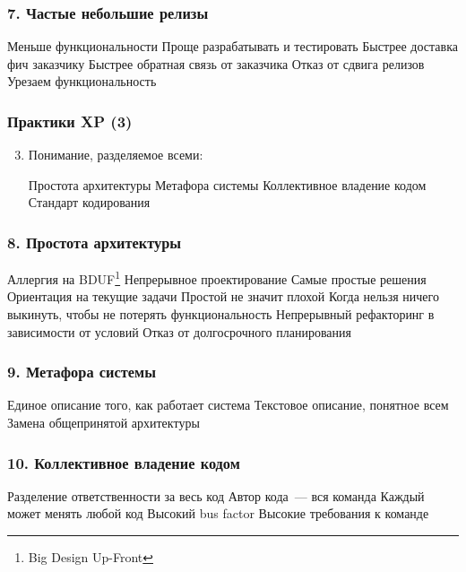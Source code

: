 \documentclass{../../slides-style}
\begin{document}
    \begin{frame}
        \frametitle{7. Частые небольшие релизы}
        \begin{outline}
            \1 Меньше функциональности
                \2 Проще разрабатывать и тестировать
            \1 Быстрее доставка фич заказчику
            \1 Быстрее обратная связь от заказчика
            \1 Отказ от сдвига релизов
                \2 Урезаем функциональность
        \end{outline}
    \end{frame}

    \begin{frame}
        \frametitle{Практики XP (3)}
        \begin{enumerate}
            \setcounter{enumi}{2}
            \item Понимание, разделяемое всеми:
            \begin{outline}
                \1 Простота архитектуры
                \1 Метафора системы
                \1 Коллективное владение кодом
                \1 Стандарт кодирования
            \end{outline}
        \end{enumerate}
    \end{frame}

    \begin{frame}
        \frametitle{8. Простота архитектуры}
        \begin{outline}
            \1 Аллергия на BDUF\footnote{Big Design Up-Front}
            \1 Непрерывное проектирование
            \1 Самые простые решения
                \2 Ориентация на текущие задачи
                    \3 Простой не значит плохой
                    \3 Когда нельзя ничего выкинуть, чтобы не потерять функциональность
                \2 Непрерывный рефакторинг в зависимости от условий
            \1 Отказ от долгосрочного планирования
        \end{outline}
    \end{frame}

    \begin{frame}
        \frametitle{9. Метафора системы}
        \begin{outline}
            \1 Единое описание того, как работает система
                \2 Текстовое описание, понятное всем
            \1 Замена общепринятой архитектуры
        \end{outline}
    \end{frame}

    \begin{frame}
        \frametitle{10. Коллективное владение кодом}
        \begin{outline}
            \1 Разделение ответственности за весь код
                \2 Автор кода~--- вся команда
            \1 Каждый может менять любой код
                \2 Высокий bus factor 
                \2 Высокие требования к команде
        \end{outline}
    \end{frame}
\end{document}
